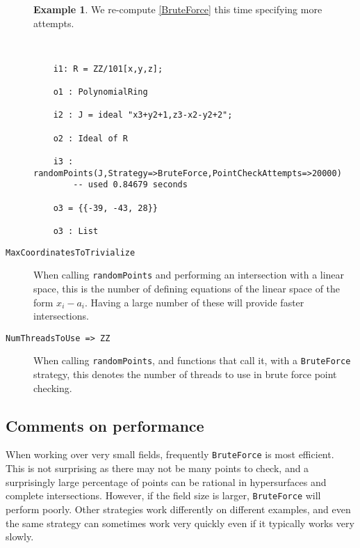 \documentclass[11pt]{amsart}
\theoremstyle{definition}
\newtheorem{example}{Example}[section]
\begin{document}
\begin{description}
		
	\begin{example}
		
	We re-compute \cref{BruteForce} this time specifying more attempts.
	
	~~

		{{\small\color{blue}
		\begin{verbatim}
	i1: R = ZZ/101[x,y,z];

	o1 : PolynomialRing

	i2 : J = ideal "x3+y2+1,z3-x2-y2+2";

	o2 : Ideal of R

	i3 : randomPoints(J,Strategy=>BruteForce,PointCheckAttempts=>20000)
		-- used 0.84679 seconds

	o3 = {{-39, -43, 28}}

	o3 : List
	\end{verbatim}
	}}
	\end{example}

	\vspace{1em}
	\item[\tt MaxCoordinatesToTrivialize]

	When calling {\tt randomPoints} and performing an intersection with a linear space, this is the number of defining equations of the linear space of the form $x_i - a_i$.  Having a large number of these will provide faster intersections.
	
	\vspace{1em}
	\item[\tt NumThreadsToUse => ZZ]

	When calling {\tt randomPoints}, and functions that call it, with a {\tt BruteForce} strategy, this denotes the number of threads to use in brute force point checking.
\end{description}

\subsection{Comments on performance}

	When working over very small fields, frequently {\tt BruteForce} is most efficient.  This is not surprising as there may not be many points to check, and a surprisingly large percentage of points can be rational in hypersurfaces and complete intersections.  However, if the field size is larger, {\tt BruteForce} will perform poorly.  Other strategies work differently on different examples, and even the same strategy can sometimes work very quickly even if it typically works very slowly.
	
\end{document}
